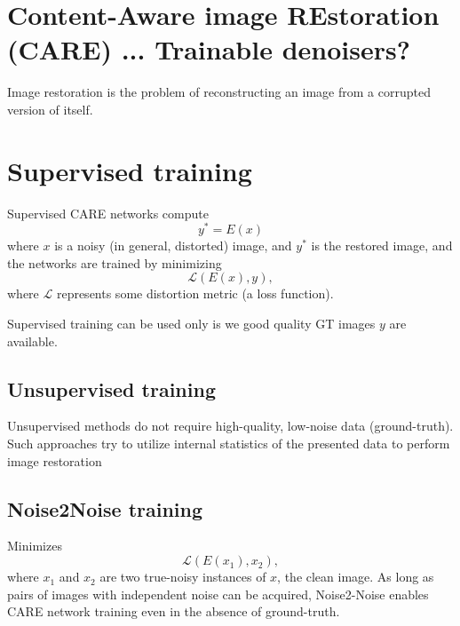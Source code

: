 \chapter{Content-Aware image REstoration (CARE) ... Trainable denoisers?}

Image restoration is the problem of reconstructing an image from a corrupted version of itself. %

\chapter{Supervised training}

Supervised CARE networks compute
\begin{equation}
  y^* = E(x)
\end{equation}
where $x$ is a noisy (in general, distorted) image, and $y^*$ is the restored image, and the networks are trained by minimizing
\begin{equation}
  \mathcal{L}(E(x), y),
\end{equation}
where $\mathcal{L}$ represents some distortion metric (a loss
function). %

Supervised training can be used only is we good quality GT images $y$
are
available. %

\section{Unsupervised training}

Unsupervised methods do not require high-quality, low-noise data
(ground-truth).  Such approaches try to utilize internal statistics of
the presented data to perform image
restoration %

\section{Noise2Noise training}


Minimizes
\begin{equation}
  {\mathcal L}(E(x_1),x_2),
\end{equation}
where $x_1$ and $x_2$ are two true-noisy instances of $x$, the clean
image. As long as pairs of images with independent noise can be
acquired, Noise2-Noise enables CARE network training even in the
absence of ground-truth. %

